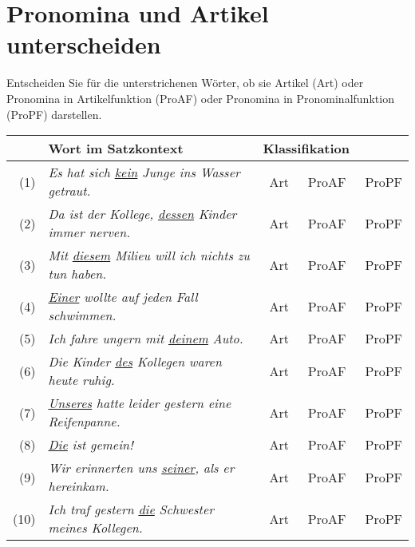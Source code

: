 \newpage

\section{Pronomina und Artikel unterscheiden}

Entscheiden Sie für die unterstrichenen Wörter, ob sie Artikel (Art) oder Pronomina in Artikelfunktion (ProAF) oder Pronomina in Pronominalfunktion (ProPF) darstellen.

\begin{center}
  \begin{tabular}[h]{rll}
    \toprule
    & \textbf{Wort im Satzkontext} & \textbf{Klassifikation} \\
    \midrule
    (1) & \textit{Es hat sich \uline{kein} Junge ins Wasser getraut.} & \Solalt{\XBox}{\Square}~Art\ \ \Solalt{\Square}{\Square}~ProAF\ \ \Solalt{\Square}{\Square}~ProPF \\
    (2) & \textit{Da ist der Kollege, \uline{dessen} Kinder immer nerven.} & \Solalt{\Square}{\Square}~Art\ \ \Solalt{\Square}{\Square}~ProAF\ \ \Solalt{\XBox}{\Square}~ProPF \\
    (3) & \textit{Mit \uline{diesem} Milieu will ich nichts zu tun haben.} & \Solalt{\Square}{\Square}~Art\ \ \Solalt{\XBox}{\Square}~ProAF\ \ \Solalt{\Square}{\Square}~ProPF \\
    (4) & \textit{\uline{Einer} wollte auf jeden Fall schwimmen.} & \Solalt{\Square}{\Square}~Art\ \ \Solalt{\Square}{\Square}~ProAF\ \ \Solalt{\XBox}{\Square}~ProPF \\
    (5) & \textit{Ich fahre ungern mit \uline{deinem} Auto.} & \Solalt{\XBox}{\Square}~Art\ \ \Solalt{\Square}{\Square}~ProAF\ \ \Solalt{\Square}{\Square}~ProPF \\
    (6) & \textit{Die Kinder \uline{des} Kollegen waren heute ruhig.} & \Solalt{\XBox}{\Square}~Art\ \ \Solalt{\Square}{\Square}~ProAF\ \ \Solalt{\Square}{\Square}~ProPF \\
    (7) & \textit{\uline{Unseres} hatte leider gestern eine Reifenpanne.} & \Solalt{\Square}{\Square}~Art\ \ \Solalt{\Square}{\Square}~ProAF\ \ \Solalt{\XBox}{\Square}~ProPF \\
    (8) & \textit{\uline{Die} ist gemein!} & \Solalt{\Square}{\Square}~Art\ \ \Solalt{\Square}{\Square}~ProAF\ \ \Solalt{\XBox}{\Square}~ProPF \\
    (9) & \textit{Wir erinnerten uns \uline{seiner}, als er hereinkam.} & \Solalt{\Square}{\Square}~Art\ \ \Solalt{\Square}{\Square}~ProAF\ \ \Solalt{\XBox}{\Square}~ProPF \\
    (10) & \textit{Ich traf gestern \uline{die} Schwester meines Kollegen.} & \Solalt{\XBox}{\Square}~Art\ \ \Solalt{\Square}{\Square}~ProAF\ \ \Solalt{\Square}{\Square}~ProPF \\
    \bottomrule
  \end{tabular}
\end{center}

